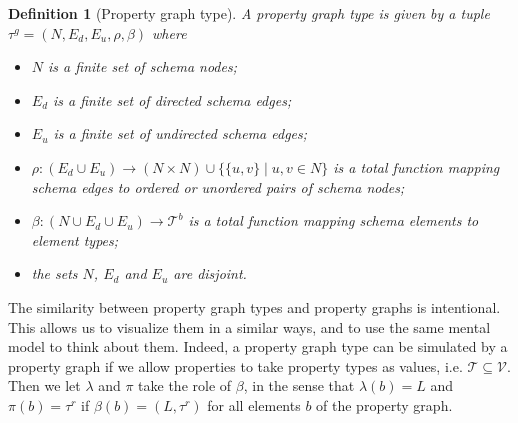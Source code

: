 \documentclass[a4paper]{article}
\newtheorem{definition}[theorem]{Definition}
\newcommand{\ptypes}{\mathcal{T}}
\newcommand{\rtype}{\tau^r}
\newcommand{\btypes}{\mathcal{T}^b}
\newcommand{\gtype}{\tau^g}
\begin{document}
\begin{definition}[Property graph type]
  A \emph{property graph type} is given by a tuple $\gtype = (N, E_d, E_u, \rho, \beta)$ where 
  \begin{itemize}
    \item $N$ is a finite set of schema nodes;
    \item $E_d$ is a finite set of directed schema edges;
    \item $E_u$ is a finite set of undirected schema edges;
    \item $\rho : (E_d \cup E_u) \to (N \times N) \cup \{\{u, v\} \mid u, v \in N\}$ is a total function mapping schema edges to ordered or unordered pairs of schema nodes;
    \item $\beta : (N \cup E_d \cup E_u) \to \btypes$ is a total function mapping schema elements to element types;
    \item the sets $N$, $E_d$ and $E_u$ are disjoint.
  \end{itemize}
\end{definition}

The similarity between property graph types and property graphs is intentional. This allows us to visualize them in a similar ways, and to use the same mental model to think about them. Indeed, a property graph type can be simulated by a property graph if we allow properties to take property types as values, i.e. $\ptypes \subseteq \mathcal{V}$. Then we let $\lambda$ and $\pi$ take the role of $\beta$, in the sense that $\lambda(b) = L$ and $\pi(b) = \rtype$ if $\beta(b) = (L, \rtype)$ for all elements $b$ of the property graph.
\end{document}
